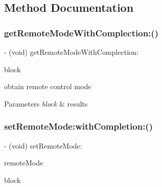 \subsection{Method Documentation}
\mbox{\label{interface_p_v_flight_remote_a2c02b505033ffbb16e10a8f0d1a10923}} 
\subsubsection{\texorpdfstring{get\+Remote\+Mode\+With\+Complection\+:()}{getRemoteModeWithComplection:()}}
{\footnotesize\ttfamily -\/ (void) get\+Remote\+Mode\+With\+Complection\+: \begin{DoxyParamCaption}\item[{(void($^\wedge$)(P\+V\+Flight\+Remote\+Mode remote\+Mode, N\+S\+Error $\ast$\+\_\+\+Nullable error))}]{block }\end{DoxyParamCaption}}

obtain remote control mode


\begin{DoxyParams}{Parameters}
{\em block} & results \\
\hline
\end{DoxyParams}
\mbox{\label{interface_p_v_flight_remote_a149edf47f82fa3d0ad707c81ca114cdf}} 
\subsubsection{\texorpdfstring{set\+Remote\+Mode\+:with\+Completion\+:()}{setRemoteMode:withCompletion:()}}
{\footnotesize\ttfamily -\/ (void) set\+Remote\+Mode\+: \begin{DoxyParamCaption}\item[{(P\+V\+Flight\+Remote\+Mode)}]{remote\+Mode }\item[{withCompletion:(P\+V\+Completion\+Block)}]{block }\end{DoxyParamCaption}}

